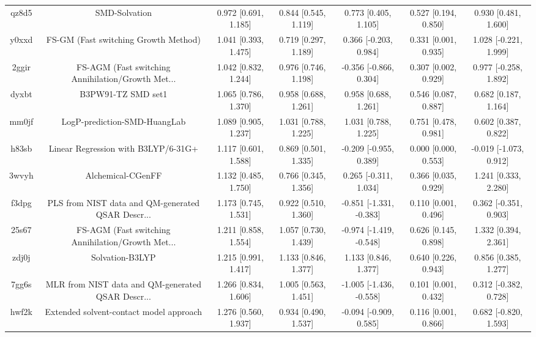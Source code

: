 \documentclass{article}
\begin{document}
\begin{center}
\begin{longtable}{|ccccccc|}
 qz8d5 &                                      SMD-Solvation &  0.972 [0.691, 1.185] &  0.844 [0.545, 1.119] &     0.773 [0.405, 1.105] &  0.527 [0.194, 0.850] &    0.930 [0.481, 1.600] \\
 y0xxd &               FS-GM (Fast switching Growth Method) &  1.041 [0.393, 1.475] &  0.719 [0.297, 1.189] &    0.366 [-0.203, 0.984] &  0.331 [0.001, 0.935] &   1.028 [-0.221, 1.999] \\
 2ggir &  FS-AGM (Fast switching Annihilation/Growth Met... &  1.042 [0.832, 1.244] &  0.976 [0.746, 1.198] &   -0.356 [-0.866, 0.304] &  0.307 [0.002, 0.929] &   0.977 [-0.258, 1.892] \\
 dyxbt &                                 B3PW91-TZ SMD set1 &  1.065 [0.786, 1.370] &  0.958 [0.688, 1.261] &     0.958 [0.688, 1.261] &  0.546 [0.087, 0.887] &    0.682 [0.187, 1.164] \\
 mm0jf &                       LogP-prediction-SMD-HuangLab &  1.089 [0.905, 1.237] &  1.031 [0.788, 1.225] &     1.031 [0.788, 1.225] &  0.751 [0.478, 0.981] &    0.602 [0.387, 0.822] \\
 h83sb &                Linear Regression with B3LYP/6-31G+ &  1.117 [0.601, 1.588] &  0.869 [0.501, 1.335] &   -0.209 [-0.955, 0.389] &  0.000 [0.000, 0.553] &  -0.019 [-1.073, 0.912] \\
 3wvyh &                                  Alchemical-CGenFF &  1.132 [0.485, 1.750] &  0.766 [0.345, 1.356] &    0.265 [-0.311, 1.034] &  0.366 [0.035, 0.929] &    1.241 [0.333, 2.280] \\
 f3dpg &  PLS from NIST data and QM-generated QSAR Descr... &  1.173 [0.745, 1.531] &  0.922 [0.510, 1.360] &  -0.851 [-1.331, -0.383] &  0.110 [0.001, 0.496] &   0.362 [-0.351, 0.903] \\
 25s67 &  FS-AGM (Fast switching Annihilation/Growth Met... &  1.211 [0.858, 1.554] &  1.057 [0.730, 1.439] &  -0.974 [-1.419, -0.548] &  0.626 [0.145, 0.898] &    1.332 [0.394, 2.361] \\
 zdj0j &                                    Solvation-B3LYP &  1.215 [0.991, 1.417] &  1.133 [0.846, 1.377] &     1.133 [0.846, 1.377] &  0.640 [0.226, 0.943] &    0.856 [0.385, 1.277] \\
 7gg6s &  MLR from NIST data and QM-generated QSAR Descr... &  1.266 [0.834, 1.606] &  1.005 [0.563, 1.451] &  -1.005 [-1.436, -0.558] &  0.101 [0.001, 0.432] &   0.312 [-0.382, 0.728] \\
 hwf2k &            Extended solvent-contact model approach &  1.276 [0.560, 1.937] &  0.934 [0.490, 1.537] &   -0.094 [-0.909, 0.585] &  0.116 [0.001, 0.866] &   0.682 [-0.820, 1.593] \\

\end{longtable}
\end{center}
\end{document}
